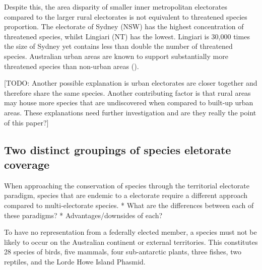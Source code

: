\documentclass[a4paper,11pt]{article}
\begin{document}
Despite this, the area disparity of smaller inner metropolitan electorates compared to the larger rural electorates is not equivalent to threatened species proportion. The electorate of Sydney (NSW) has the highest concentration of threatened species, whilst Lingiari (NT) has the lowest. Lingiari is 30,000 times the size of Sydney yet contains less than double the number of threatened species. Australian urban areas are known to support substantially more threatened species than non-urban areas (\cite{ivesCitiesAreHotspots2016, soanesConservationOpportunitiesThreatened2020}). 

[TODO: Another possible explanation is urban electorates are closer together and therefore share the same species. Another contributing factor is that rural areas may house more species that are undiscovered when compared to built-up urban areas. These explanations need further investigation and are they really the point of this paper?]

\subsection{Two distinct groupings of species eletorate coverage}
When approaching the conservation of species through the territorial electorate paradigm, species that are endemic to a electorate require a different approach compared to multi-electorate species.
* What are the differences between each of these paradigms?
* Advantages/downsides of each?



To have no representation from a federally elected member, a species must not be likely to occur on the Australian continent or external territories. This constitutes 28 species of birds, five mammals, four sub-antarctic plants, three fishes, two reptiles, and the Lorde Howe Island Phasmid. 

\end{document}
